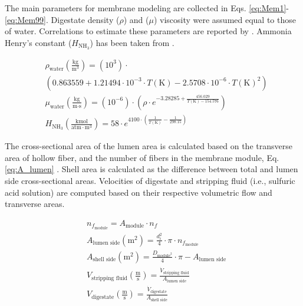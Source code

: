 \begin{refsection}[referencesApD]
The main parameters for membrane modeling are collected in Eqs. \ref{eq:Mem1}-\ref{eq:Mem99}. Digestate density ($\rho$) and ($\mu$) viscosity were assumed equal to those of water. Correlations to estimate these parameters are reported by \citet{hsu1997densities}. Ammonia Henry's constant ($H_{\text{NH}_3}$)
has been taken from \citet{linstrom2001nist}.

\begin{align}
& \rho_{\text{water}} \left(\frac{\text{kg}}{\text{m}^3}\right) = (10^3) \cdot \nonumber \\
& \left(0.863559+1.21494 \cdot 10^{-3} \cdot T(\text{K}) - 2.5708 \cdot 10^{-6} \cdot T(\text{K})^2\right) \label{eq:Mem1} 
\\
& \mu_{\text{water}} \left(\frac{\text{kg}}{\text{m} \cdot \text{s}}\right) = (10^{-6}) \cdot \left(\rho \cdot e^{-3.28285+\frac{456.029}{T(\text{K})-154.576}}\right) \label{eq:Mem2} 
\\
& H_{\text{NH}_3} \left(\frac{\text{kmol}}{\text{atm} \cdot \text{m}^3}\right) = 58 \cdot e^{4100 \cdot \left(\frac{1}{T(\text{K})} - \frac{1}{298.15}\right)}
\label{eq:Mem3}
\end{align}

The cross-sectional area of the lumen area is calculated based on the transverse area of hollow fiber, and the number of fibers in the membrane module, Eq. \ref{eq:A_lumen} . Shell area is calculated as the difference between total and lumen side cross-sectional areas. 
Velocities of digestate and stripping fluid (i.e., sulfuric acid solution) are computed based on their respective volumetric flow and transverse areas.

\begin{align}
& n_{f_{\text{module}}} = A_{\text{module}} \cdot n_f \label{eq:Memnf} 
\\
& A_{\text{lumen side}} \left(\text{m}^2\right) = \frac{d_i^2}{4} \cdot \pi \cdot n_{f_{\text{module}}} \label{eq:A_lumen} 
\\
& A_{\text{shell side}} \left(\text{m}^2\right) = \frac{D_{\text{module}^2}}{4} \cdot \pi - A_{\text{lumen side}} \label{eq:A_shell} 
\\
& V_{\text{stripping fluid}} \left(\frac{\text{m}}{\text{s}}\right) = \frac{\dot{V}_{\text{stripping fluid}}}{A_{\text{lumen side}}} \label{eq:V_stripping}
\\
& V_{\text{digestate}} \left(\frac{\text{m}}{\text{s}}\right) = \frac{\dot{V}_{\text{digestate}}}{A_{\text{shell side}}} \label{eq:V_digestate}
\end{align}


\end{refsection}
